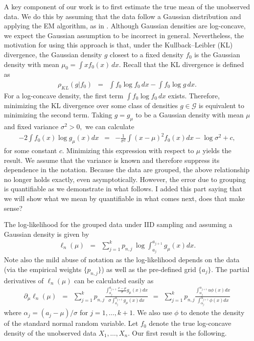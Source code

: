 \documentclass[12pt]{article} %
\newcommand{\comC}[1]{{\noindent  \color{orange}#1}}
\begin{document}
A key component of our work is to first estimate the true mean of the unobserved data. We do this by assuming that the data follow a Gaussian distribution and applying the EM algorithm, as in \citet{mclachlan1988fitting,teimouri2021algorithm,Zahra2022}. Although Gaussian densities are log-concave, we expect the Gaussian assumption to be incorrect in general. Nevertheless, the motivation for using this approach is that, under the Kullback--Leibler (KL) divergence, the Gaussian density $g$ closest to a fixed density $f_0$ is the Gaussian density with mean $\mu_0=\int x f_0(x)\,dx$. Recall that the KL divergence is defined as
\begin{eqnarray*}
\rho_{KL}(g\vert f_0) &=& \int f_0 \log f_0 \, dx - \int f_0 \log g \, dx.
\end{eqnarray*}
For a log-concave density, the first term $\int f_0 \log f_0 \, dx$ exists. Therefore, minimizing the KL divergence over some class of densities $g\in \mathcal G$ is equivalent to minimizing the second term. Taking $g=g_\mu$ to be a Gaussian density with mean $\mu$ and fixed variance $\sigma^2>0,$ we can calculate
\begin{eqnarray}\label{line:KL}
-2 \int f_0(x) \log g_{\mu}(x)dx &=& -\frac{1}{\sigma^2}\int (x-\mu)^2f_0(x)dx - \log \sigma^2 +c,
\end{eqnarray}
for some constant $c.$ Minimizing this expression with respect to $\mu$ yields the result. We assume that the variance is known and therefore suppress its dependence in the notation. Because the data are grouped, the above relationship no longer holds exactly, even asymptotically. However, the error due to grouping is quantifiable as we demonstrate in what follows. \comC{I added this part saying that we will show what we mean by quantifiable in what comes next, does that make sense?}

The log-likelihood for the grouped data under IID sampling and assuming a Gaussian density is given by 
\begin{eqnarray}\label{line:loglik}
\ell_n(\mu) &=& \sum_{j=1}^k p_{n,j} \ \log \int_{a_j}^{a_{j+1}}  g_{\mu}(x)dx. 
\end{eqnarray}
Note also the mild abuse of notation as the log-likelihood depends on the data (via the empirical weights $\{p_{n,j}\}$) as well as the pre-defined grid $\{a_j\}$.  The partial derivatives of $\ell_n(\mu)$ can be calculated easily as 
\begin{eqnarray*}
\partial_\mu \ell_n(\mu) & = & \sum_{j=1}^k p_{n,j} \frac{\int_{a_j}^{a_{j+1}}  \frac{x-\mu}{\sigma} g_{\mu}(x)dx}{\sigma  \int_{a_j}^{a_{j+1}}  g_{\mu}(x)dx} \ \ = \ \ \sum_{j=1}^k p_{n,j} \frac{\int_{\alpha_j}^{\alpha_{j+1}}  u \phi(x)dx}{ \int_{\alpha_j}^{\alpha_{j+1}}  \phi(x)dx}
\end{eqnarray*}
where $\alpha_j=(a_j-\mu)/\sigma$ for $j=1, \ldots, k+1.$  We also use $\phi$ to denote the density of the standard normal random variable. 
Let $f_0$ denote the true log-concave density of the unobserved data $X_1, \ldots, X_n.$  Our first result is the following.
\end{document}
